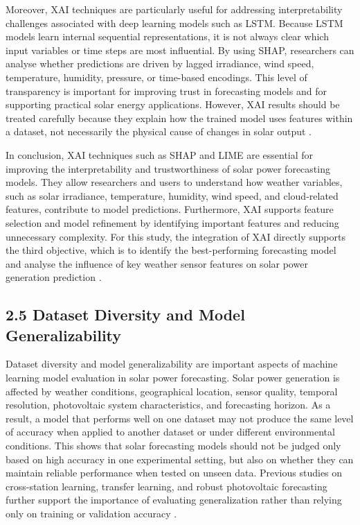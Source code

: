 Moreover, XAI techniques are particularly useful for addressing interpretability challenges associated with deep learning models such as LSTM. Because LSTM models learn internal sequential representations, it is not always clear which input variables or time steps are most influential. By using SHAP, researchers can analyse whether predictions are driven by lagged irradiance, wind speed, temperature, humidity, pressure, or time-based encodings. This level of transparency is important for improving trust in forecasting models and for supporting practical solar energy applications. However, XAI results should be treated carefully because they explain how the trained model uses features within a dataset, not necessarily the physical cause of changes in solar output \parencite{Eren2025, TsaiLo2025, Duvuru2026}.

In conclusion, XAI techniques such as SHAP and LIME are essential for improving the interpretability and trustworthiness of solar power forecasting models. They allow researchers and users to understand how weather variables, such as solar irradiance, temperature, humidity, wind speed, and cloud-related features, contribute to model predictions. Furthermore, XAI supports feature selection and model refinement by identifying important features and reducing unnecessary complexity. For this study, the integration of XAI directly supports the third objective, which is to identify the best-performing forecasting model and analyse the influence of key weather sensor features on solar power generation prediction \parencite{JnanaVarshitha2025, Eren2025, TsaiLo2025, Duvuru2026}.




\subsection{2.5 Dataset Diversity and Model Generalizability}

Dataset diversity and model generalizability are important aspects of machine learning model evaluation in solar power forecasting. Solar power generation is affected by weather conditions, geographical location, sensor quality, temporal resolution, photovoltaic system characteristics, and forecasting horizon. As a result, a model that performs well on one dataset may not produce the same level of accuracy when applied to another dataset or under different environmental conditions. This shows that solar forecasting models should not be judged only based on high accuracy in one experimental setting, but also on whether they can maintain reliable performance when tested on unseen data. Previous studies on cross-station learning, transfer learning, and robust photovoltaic forecasting further support the importance of evaluating generalization rather than relying only on training or validation accuracy \parencite{Eren2025, Ma2025}.

